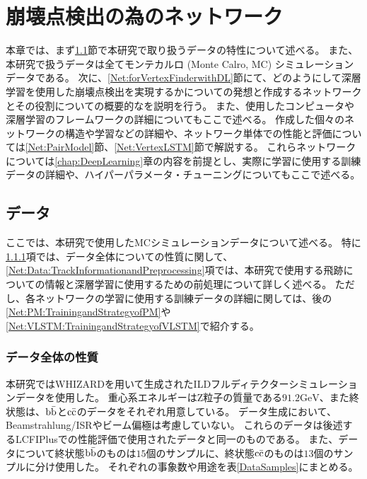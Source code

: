 
\chapter{崩壊点検出の為のネットワーク} \label{chap:Networks}

本章では、まず\ref{Net:Data}節で本研究で取り扱うデータの特性について述べる。
また、本研究で扱うデータは全てモンテカルロ (Monte Calro, MC) シミュレーションデータである。
次に、\ref{Net:forVertexFinderwithDL}節にて、どのようにして深層学習を使用した崩壊点検出を実現するかについての発想と作成するネットワークとその役割についての概要的なを説明を行う。
また、使用したコンピュータや深層学習のフレームワークの詳細についてもここで述べる。
作成した個々のネットワークの構造や学習などの詳細や、ネットワーク単体での性能と評価については\ref{Net:PairModel}節、\ref{Net:VertexLSTM}節で解説する。
これらネットワークについては\ref{chap:DeepLearning}章の内容を前提とし、実際に学習に使用する訓練データの詳細や、ハイパーパラメータ・チューニングについてもここで述べる。

\section{データ} \label{Net:Data}

ここでは、本研究で使用したMCシミュレーションデータについて述べる。
特に\ref{Net:Data:DataProperty}項では、データ全体についての性質に関して、\ref{Net:Data:TrackInformationandPreprocessing}項では、本研究で使用する飛跡についての情報と深層学習に使用するための前処理について詳しく述べる。
ただし、各ネットワークの学習に使用する訓練データの詳細に関しては、後の\ref{Net:PM:TrainingandStrategyofPM}や\ref{Net:VLSTM:TrainingandStrategyofVLSTM}で紹介する。

\subsection{データ全体の性質} \label{Net:Data:DataProperty}

本研究ではWHIZARD\cite{WHIZARDpaper}を用いて生成されたILDフルディテクターシミュレーションデータを使用した。
重心系エネルギーはZ粒子の質量である$91.2 \mathrm{GeV}$、また終状態は、$\rm b\bar{b}$と$\rm c\bar{c}$のデータをそれぞれ用意している。
データ生成において、Beamstrahlung/ISRやビーム偏極は考慮していない。
これらのデータは後述するLCFIPlusでの性能評価\cite{LCFIPluspaper}で使用されたデータと同一のものである。
また、データについて終状態$\rm b\bar{b}$のものは$15$個のサンプルに、終状態$\rm c\bar{c}$のものは$13$個のサンプルに分け使用した。
それぞれの事象数や用途を表\ref{DataSamples}にまとめる。

